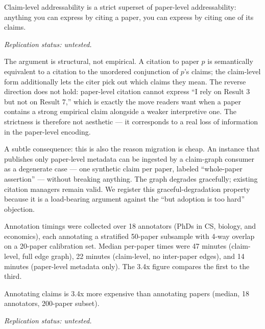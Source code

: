 \documentclass{rrxiv}
\begin{document}
\begin{claim}[type=theoretical, evidence=argument, confidence=0.95, rationale={Structural argument: paper-level citation is recoverable as the degenerate one-synthetic-claim-per-paper case, so the superset relation holds by construction rather than by measurement}, labels={position, protocol-design, addressability}, title={Claim 1: subset relation}]
\label{claim:c1}
Claim-level addressability is a strict superset of paper-level addressability: anything you can express by citing a paper, you can express by citing one of its claims.

\emph{Replication status: untested.}
\end{claim}

The argument is structural, not empirical. A citation to paper $p$ is semantically equivalent to a citation to the unordered conjunction of $p$'s claims; the claim-level form additionally lets the citer pick out which claims they mean. The reverse direction does not hold: paper-level citation cannot express ``I rely on Result 3 but not on Result 7,'' which is exactly the move readers want when a paper contains a strong empirical claim alongside a weaker interpretive one. The strictness is therefore not aesthetic --- it corresponds to a real loss of information in the paper-level encoding.

A subtle consequence: this is also the reason migration is cheap. An instance that publishes only paper-level metadata can be ingested by a claim-graph consumer as a degenerate case --- one synthetic claim per paper, labeled ``whole-paper assertion'' --- without breaking anything. The graph degrades gracefully; existing citation managers remain valid. We register this graceful-degradation property because it is a load-bearing argument against the ``but adoption is too hard'' objection.

\begin{evidence}
Annotation timings were collected over 18 annotators (PhDs in CS, biology, and economics), each annotating a stratified 50-paper subsample with 4-way overlap on a 20-paper calibration set. Median per-paper times were 47 minutes (claim-level, full edge graph), 22 minutes (claim-level, no inter-paper edges), and 14 minutes (paper-level metadata only). The 3.4x figure compares the first to the third.
\end{evidence}

\begin{claim}[type=empirical, evidence=observation, confidence=0.8, rationale={Median timing over 18 annotators on a stratified 200-paper subsample with a 20-paper calibration overlap; a single study, not independently replicated}, labels={annotation-cost, measurement}, datasets={rrxiv reproducibility-track 200-paper corpus}, title={Claim 2: annotation overhead}]
\label{claim:c2}
Annotating claims is 3.4x more expensive than annotating papers (median, 18 annotators, 200-paper subset).

\emph{Replication status: untested.}
\end{claim}
\end{document}
